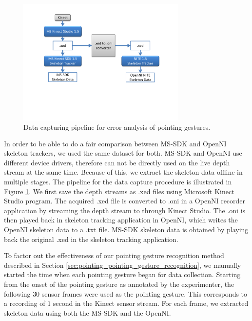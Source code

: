 \begin{figure}[h]
\centering
\includegraphics[width=0.75\textwidth]{pics/xedoni_2_cropped}
\caption{Data capturing pipeline for error analysis of pointing gestures.}
\label{fig:xedoni}
\end{figure}

In order to be able to do a fair comparison between MS-SDK and OpenNI skeleton trackers, we used the same dataset for both. MS-SDK and OpenNI use different device drivers, therefore can not be directly used on the live depth stream at the same time. Because of this, we extract the skeleton data offline in multiple stages. The pipeline for the data capture procedure is illustrated in Figure \ref{fig:xedoni}. We first save the depth streams as .xed files using Microsoft Kinect Studio program. The acquired .xed file is converted to .oni in a OpenNI recorder application by streaming the depth stream to through Kinect Studio. The .oni is then played back in skeleton tracking application in OpenNI, which writes the OpenNI skeleton data to a .txt file. MS-SDK skeleton data is obtained by playing back the original .xed in the skeleton tracking application.


To factor out the effectiveness of our pointing gesture recognition method described in Section \ref{sec:pointing_pointing_gesture_recognition}, we manually started the time when each pointing gesture began for data collection. Starting from the onset of the pointing gesture as annotated by the experimenter, the following $30$ sensor frames were used as the pointing gesture. This corresponds to a recording of $1$ second in the Kinect sensor stream. For each frame, we extracted skeleton data using both the MS-SDK and the OpenNI.

